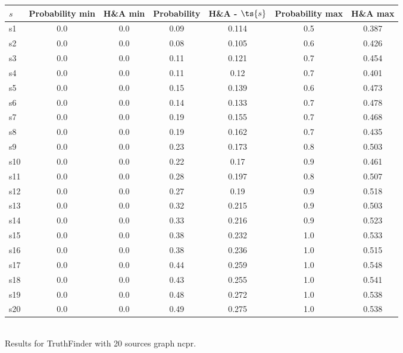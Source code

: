 \documentclass{article}
\begin{document}
\noindent\begin{tabular}{|l|c|c|c|c|c|c|}
\hline
$s$& Probability min & H\&A min & Probability & H\&A - $\ts{s}$ & Probability max & H\&A max\\
\hline
s1 &0.0 & 0.0 & 0.09 & 0.114 & 0.5 & 0.387\\
\hline
s2 &0.0 & 0.0 & 0.08 & 0.105 & 0.6 & 0.426\\
\hline
s3 &0.0 & 0.0 & 0.11 & 0.121 & 0.7 & 0.454\\
\hline
s4 &0.0 & 0.0 & 0.11 & 0.12 & 0.7 & 0.401\\
\hline
s5 &0.0 & 0.0 & 0.15 & 0.139 & 0.6 & 0.473\\
\hline
s6 &0.0 & 0.0 & 0.14 & 0.133 & 0.7 & 0.478\\
\hline
s7 &0.0 & 0.0 & 0.19 & 0.155 & 0.7 & 0.468\\
\hline
s8 &0.0 & 0.0 & 0.19 & 0.162 & 0.7 & 0.435\\
\hline
s9 &0.0 & 0.0 & 0.23 & 0.173 & 0.8 & 0.503\\
\hline
s10 &0.0 & 0.0 & 0.22 & 0.17 & 0.9 & 0.461\\
\hline
s11 &0.0 & 0.0 & 0.28 & 0.197 & 0.8 & 0.507\\
\hline
s12 &0.0 & 0.0 & 0.27 & 0.19 & 0.9 & 0.518\\
\hline
s13 &0.0 & 0.0 & 0.32 & 0.215 & 0.9 & 0.503\\
\hline
s14 &0.0 & 0.0 & 0.33 & 0.216 & 0.9 & 0.523\\
\hline
s15 &0.0 & 0.0 & 0.38 & 0.232 & 1.0 & 0.533\\
\hline
s16 &0.0 & 0.0 & 0.38 & 0.236 & 1.0 & 0.515\\
\hline
s17 &0.0 & 0.0 & 0.44 & 0.259 & 1.0 & 0.548\\
\hline
s18 &0.0 & 0.0 & 0.43 & 0.255 & 1.0 & 0.541\\
\hline
s19 &0.0 & 0.0 & 0.48 & 0.272 & 1.0 & 0.538\\
\hline
s20 &0.0 & 0.0 & 0.49 & 0.275 & 1.0 & 0.538\\
\hline
\end{tabular}\\

\noindent Results for TruthFinder with 20 sources graph ncpr.
\end{document}

